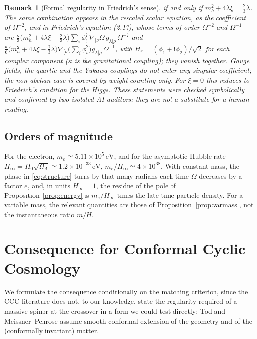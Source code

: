 \documentclass[11pt,a4paper]{article}
\newtheorem{remark}{Remark}
\theoremstyle{definition}
\newcommand{\ii}{\mathrm{i}}
\begin{document}
\begin{remark}[Formal regularity in Friedrich's sense]
if and only if $m_{h}^{2}+4\lambda\xi=\tfrac23\lambda$. The same combination appears in the rescaled scalar equation, as the coefficient of $\Omega^{-2}$, and in Friedrich's equation (2.17), whose terms of order $\Omega^{-2}$ and $\Omega^{-1}$ are $\tfrac{\kappa}{3}\bigl(m_{h}^{2}+4\lambda\xi-\tfrac23\lambda\bigr)\sum_{i}\phi_{i}^{2}\,\nabla_{[\nu}\Omega\,g_{\lambda]\rho}\,\Omega^{-2}$ and $\tfrac{\kappa}{6}\bigl(m_{h}^{2}+4\lambda\xi-\tfrac23\lambda\bigr)\nabla_{[\nu}\bigl(\sum_{i}\phi_{i}^{2}\bigr)g_{\lambda]\rho}\,\Omega^{-1}$, with $H_{r}=(\phi_{1}+\ii\phi_{2})/\sqrt2$ for each complex component ($\kappa$ is the gravitational coupling); they vanish together. Gauge fields, the quartic and the Yukawa couplings do not enter any singular coefficient; the non-abelian case is covered by weight counting only. For $\xi=0$ this reduces to Friedrich's condition for the Higgs. These statements were checked symbolically and confirmed by two isolated AI auditors; they are not a substitute for a human reading.
\end{remark}

\subsection{Orders of magnitude}

For the electron, $m_{e}\simeq5.11\times10^{5}\,\mathrm{eV}$, and for the asymptotic Hubble rate $H_{\infty}=H_{0}\sqrt{\Omega_{\Lambda}}\simeq1.2\times10^{-33}\,\mathrm{eV}$, $m_{e}/H_{\infty}\simeq4\times10^{38}$. With constant mass, the phase in \eqref{eq:structure} turns by that many radians each time $\Omega$ decreases by a factor $e$, and, in units $H_{\infty}=1$, the residue of the pole of Proposition~\ref{prop:energy} is $m_{e}/H_{\infty}$ times the late-time particle density. For a variable mass, the relevant quantities are those of Proposition~\ref{prop:varmass}, not the instantaneous ratio $m/H$.

\section{Consequence for Conformal Cyclic Cosmology}
\label{sec:ccc}

We formulate the consequence conditionally on the matching criterion, since the CCC literature does not, to our knowledge, state the regularity required of a massive spinor at the crossover in a form we could test directly; Tod \cite{Tod2013} and Meissner--Penrose \cite{MeissnerPenrose2025} assume smooth conformal extension of the geometry and of the (conformally invariant) matter.
\end{document}
